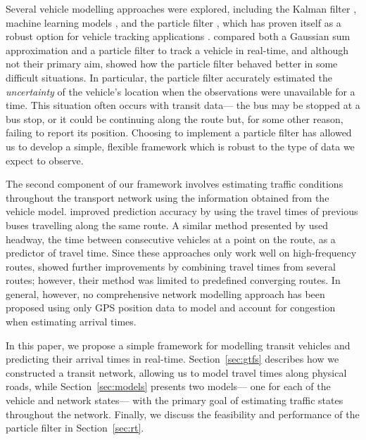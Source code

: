 Several vehicle modelling approaches were explored, 
including the Kalman filter \citep{Dailey_2001,Cathey_2003},
machine learning models \citep{Yu_2006,Chang_2010},
and the particle filter \citep{Hans_2015},
which has proven itself as a robust option for
\rt vehicle tracking applications
\citep{Gustafsson_2002,Davidson_2011}.
\cite{Ulmke_2006} compared both a Gaussian sum approximation and a particle filter
to track a vehicle in real-time,
and although not their primary aim,
showed how the particle filter behaved better in some difficult situations.
In particular, the particle filter accurately estimated the \emph{uncertainty}
of the vehicle's location when the observations were unavailable for a time.
This situation often occurs with transit data---%
the bus may be stopped at a bus stop, or it could be continuing along the route but,
for some other reason, failing to report its position.
Choosing to implement a particle filter has allowed us
to develop a simple, flexible framework
which is robust to the type of data we expect to observe.


The second component of our framework 
involves estimating traffic conditions throughout the transport network
using the information obtained from the vehicle model.
\cite{Yu_2010} improved prediction accuracy by using the travel times
of previous buses travelling along the same route.
A similar method presented by \cite{Hans_2015}
used headway, the time between consecutive vehicles at a point on the route,
as a predictor of travel time.
Since these approaches only work well on high-frequency routes,
\cite{Yu_2011} showed further improvements by combining travel times 
from several routes;
however, their method was limited to predefined converging routes.
In general, however, no comprehensive network modelling approach has been proposed using
only GPS position data to model and account for congestion when estimating arrival times.

In this paper, we propose a simple framework for modelling transit vehicles and predicting
their arrival times in real-time.
Section~\ref{sec:gtfs} describes how we constructed a transit network,
allowing us to model travel times along physical roads,
while Section~\ref{sec:models} presents two \rt models---%
one for each of the vehicle and network states---%
with the primary goal of estimating \rt traffic states throughout the network.
Finally, we discuss the \rt feasibility and performance
of the particle filter in Section~\ref{sec:rt}.



